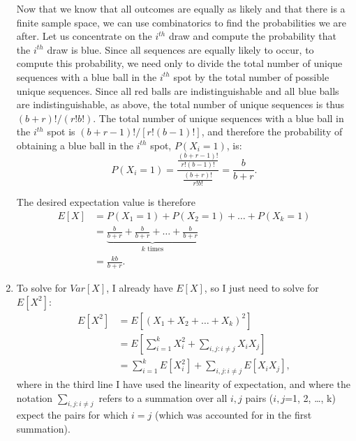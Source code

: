 \begin{problem}{5}
\begin{enumerate}
Now that we know that all outcomes are equally as likely and that there is a finite sample space, we can use combinatorics to find the probabilities we are after.  Let us concentrate on the $i^{th}$ draw and compute the probability that the $i^{th}$ draw is blue.  Since all sequences are equally likely to occur, to compute this probability, we need only to divide the total number of unique sequences with a blue ball in the $i^{th}$ spot by the total number of possible unique sequences.  Since all red balls are indistinguishable and all blue balls are indistinguishable, as above, the total number of unique sequences is thus $(b+r)!/(r!b!)$.  The total number of unique sequences with a blue ball in the $i^{th}$ spot is $(b+r-1)!/[r!(b-1)!]$, and therefore the probability of obtaining a blue ball in the $i^{th}$ spot, $P(X_i=1)$, is:
\begin{equation*}
P(X_i=1) = \frac{\frac{(b+r-1)!}{r!(b-1)!}}{\frac{(b+r)!}{r!b!}} = \frac{b}{b+r}.
\end{equation*}

The desired expectation value is therefore 
\begin{align*}
E[X] &= P(X_1 = 1)+ P(X_2 = 1)+ \ldots+P(X_k = 1)\\
& = \underbrace{\frac{b}{b+r}+\frac{b}{b+r}+\ldots+\frac{b}{b+r}}_\text{$k$ times} \\
& = \frac{kb}{b+r}.
\end{align*}

\item To solve for $Var[X]$, I already have $E[X]$, so I just need to solve for $E[X^2]$:
\begin{align*}
E[X^2] &= E[(X_1+X_2+\ldots+X_k)^2] \\
& = E\left[\sum_{i=1}^kX_i^2+\sum_{i, j: i \neq j} X_iX_j \right] \\
& = \sum_{i=1}^kE[X_i^2]+\sum_{i, j: i \neq j} E[X_iX_j],
\end{align*}
where in the third line I have used the linearity of expectation, and where the notation $\sum_{i, j: i \neq j}$ refers to a summation over all $i,j$ pairs ($i,j$=1, 2, \ldots, k) expect the pairs for which $i=j$ (which was accounted for in the first summation).


\end{enumerate}
\end{problem}
